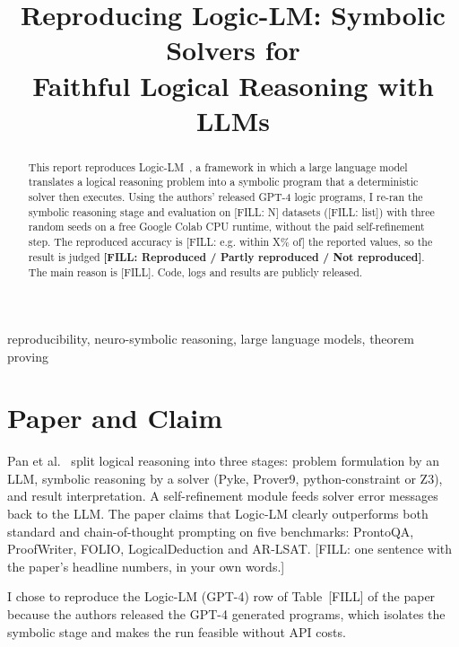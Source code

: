 \documentclass[conference]{IEEEtran}
\begin{document}
\title{Reproducing Logic-LM: Symbolic Solvers for\\Faithful Logical Reasoning with LLMs}

\author{
}

\maketitle

\begin{abstract}
This report reproduces Logic-LM~\cite{pan2023logiclm}, a framework in which a
large language model translates a logical reasoning problem into a symbolic
program that a deterministic solver then executes. Using the authors' released
GPT-4 logic programs, I re-ran the symbolic reasoning stage and evaluation on
[FILL: N] datasets ([FILL: list]) with three random seeds on a free Google Colab
CPU runtime, without the paid self-refinement step. The reproduced accuracy is
[FILL: e.g. within X\% of] the reported values, so the result is judged
\textbf{[FILL: Reproduced / Partly reproduced / Not reproduced]}. The main
reason is [FILL]. Code, logs and results are publicly released.
\end{abstract}

\begin{IEEEkeywords}
reproducibility, neuro-symbolic reasoning, large language models, theorem proving
\end{IEEEkeywords}

\section{Paper and Claim}
Pan et al.~\cite{pan2023logiclm} split logical reasoning into three stages:
problem formulation by an LLM, symbolic reasoning by a solver (Pyke, Prover9,
python-constraint or Z3), and result interpretation. A self-refinement module
feeds solver error messages back to the LLM. The paper claims that Logic-LM
clearly outperforms both standard and chain-of-thought prompting on five
benchmarks: ProntoQA, ProofWriter, FOLIO, LogicalDeduction and AR-LSAT.
[FILL: one sentence with the paper's headline numbers, in your own words.]

I chose to reproduce the Logic-LM (GPT-4) row of Table~[FILL] of the paper
because the authors released the GPT-4 generated programs, which isolates the
symbolic stage and makes the run feasible without API costs.
\end{document}
